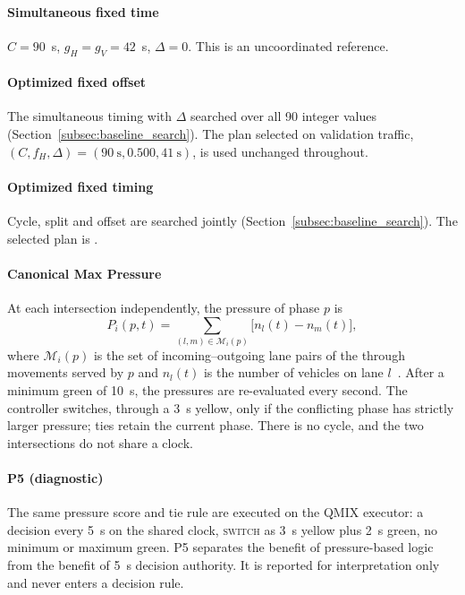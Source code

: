 \documentclass[review,12pt]{elsarticle}
\newcommand{\TBD}[1]{\textcolor{red}{\texttt{\detokenize{#1}}}}
\begin{document}
\paragraph{Simultaneous fixed time} $C=90$~s, $g_H=g_V=42$~s,
$\Delta=0$. This is an uncoordinated reference.

\paragraph{Optimized fixed offset} The simultaneous timing with $\Delta$
searched over all 90 integer values
(Section~\ref{subsec:baseline_search}). The plan selected on validation
traffic, $(C,f_H,\Delta)=(90~\mathrm{s},0.500,41~\mathrm{s})$, is used
unchanged throughout.

\paragraph{Optimized fixed timing} Cycle, split and offset are searched
jointly (Section~\ref{subsec:baseline_search}). The selected plan is
\TBD{TBD_AFTER_TIMING_VALIDATION}.

\paragraph{Canonical Max Pressure} At each intersection independently,
the pressure of phase $p$ is
\begin{equation}
P_i(p,t)=\sum_{(l,m)\in\mathcal M_i(p)}\bigl[n_l(t)-n_m(t)\bigr],
\label{eq:pressure}
\end{equation}
where $\mathcal M_i(p)$ is the set of incoming--outgoing lane pairs of
the through movements served by $p$ and $n_l(t)$ is the number of
vehicles on lane $l$~\cite{varaiya2013max}. After a minimum green of
10~s, the pressures are re-evaluated every second. The controller
switches, through a 3~s yellow, only if the conflicting phase has
strictly larger pressure; ties retain the current phase. There is no
cycle, and the two intersections do not share a clock.

\paragraph{P5 (diagnostic)} The same pressure score and tie rule are
executed on the QMIX executor: a decision every 5~s on the shared clock,
\textsc{switch} as 3~s yellow plus 2~s green, no minimum or maximum
green. P5 separates the benefit of pressure-based logic from the
benefit of 5~s decision authority. It is reported for interpretation
only and never enters a decision rule.
\end{document}
